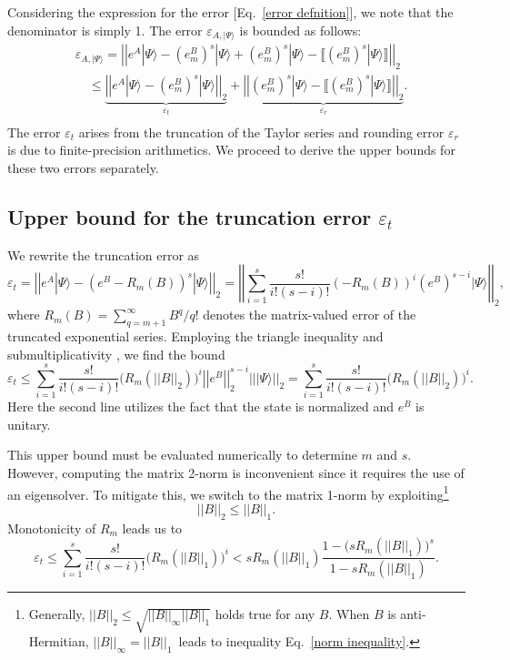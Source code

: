\documentclass[letterpaper,10pt]{iopart}
\newcommand{\dket}[1]{|#1\rangle}
\newcommand{\norm}[1]{\left|\left|#1\right|\right|}
\begin{document}
Considering the expression for the error [Eq.\ \eqref{error defnition}], we note that the denominator is simply 1. The error $\varepsilon_{A,\dket{\Psi}}$ is bounded as follows:
\begin{align}
\nonumber    &\varepsilon_{A,\dket{\Psi}}
    =\norm{e^A\dket{\Psi}-(e^B_m)^s\dket{\Psi}+(e^B_m)^s\dket{\Psi}-\llbracket (e^B_m)^s\dket{\Psi}\rrbracket}_2\\
\nonumber    &\quad \leq \underbrace{\norm{e^A\dket{\Psi}-(e^B_m)^s\dket{\Psi}}_2}_{\varepsilon_t}+\underbrace{\norm{(e^B_m)^s\dket{\Psi}-\llbracket (e^B_m)^s\dket{\Psi}\rrbracket}_2}_{\varepsilon_r}.\\
\label{epsilonA}
\end{align}
The  error $\varepsilon_t$ arises from the truncation of the Taylor series  and rounding error $\varepsilon_r$ is due to finite-precision arithmetics. We proceed to derive the upper bounds for these two errors separately.

\subsection{Upper bound for the truncation error $\varepsilon_t$}
We rewrite the truncation error as
\begin{equation}
    \varepsilon_t = \norm{e^A\dket{\Psi}-(e^B-R_m(B))^s\dket{\Psi}}_2=  \norm{\sum_{i=1}^{s}\frac{s!}{i!(s-i)!} (-R_m(B))^i(e^B)^{s-i}\dket{\Psi}}_2,
\end{equation}
where $R_m(B)=\sum_{q=m+1}^{\infty}B^q/q!$ denotes the matrix-valued error of the truncated exponential series.
Employing the triangle inequality and submultiplicativity \cite{higham2002accuracy}, we find the bound
\begin{equation}
    \varepsilon_t \leq 
    \sum_{i=1}^{s}\frac{s!}{i!(s-i)!}\big(R_m(\norm{B}_2)\big)^i\norm{e^B}_2^{s-i}\norm{\dket{\Psi}}_2=\sum_{i=1}^{s}\frac{s!}{i!(s-i)!}\big(R_m(\norm{B}_2)\big)^i.
\end{equation}
Here the second line utilizes the fact that the state is normalized and $e^B$ is unitary. 

This upper bound must be evaluated numerically to determine $m$ and $s$. However, computing the matrix 2-norm is inconvenient since it requires the use of an eigensolver. To mitigate this, we switch to the matrix 1-norm by exploiting\footnote{Generally, $\norm{B}_2\leq\sqrt{\norm{B}_\infty\norm{B}_1}$ \cite{wilkinson1994rounding} holds true for any $B$. When $B$ is anti-Hermitian, $\norm{B}_\infty=\norm{B}_1$\ leads to inequality Eq.\ \eqref{norm inequality}.}
\begin{equation}
\label{norm inequality}
    \norm{B}_2\leq\norm{B}_1.
\end{equation}
Monotonicity of $R_m$ leads us to
\begin{equation}
    \label{truncation}
    \varepsilon_t \leq 
    \sum_{i=1}^{s}\frac{s!}{i!(s-i)!}\big(R_m(\norm{B}_1)\big)^i
    < sR_m(\norm{B}_1)\frac{1-\big(sR_m(\norm{B}_1)\big)^s}{1-sR_m(\norm{B}_1)}.
\end{equation}
\end{document}
